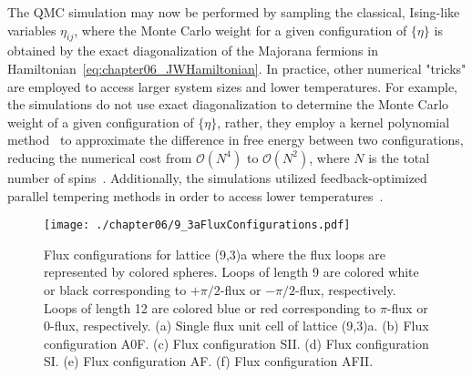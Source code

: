 The QMC simulation may now be performed by sampling the classical, Ising-like variables $\eta_{ij}$, where the Monte Carlo weight for a given configuration of $\{\eta\}$ is obtained by the exact diagonalization of the Majorana fermions in Hamiltonian~\eqref{eq:chapter06_JWHamiltonian}.
In practice, other numerical "tricks" are employed to access larger system sizes and lower temperatures.
For example, the simulations do not use exact diagonalization to determine the Monte Carlo weight of a given configuration of $\{\eta\}$, rather, they employ a kernel polynomial method~\cite{WeisseRMP2006,WeissePRL2009} to approximate the difference in free energy between two configurations, reducing the numerical cost from $\mathcal{O}(N^4)$ to $\mathcal{O}(N^2)$, where $N$ is the total number of spins~\cite{MischenkoPRB2017}.
Additionally, the simulations utilized feedback-optimized parallel tempering methods in order to access lower temperatures~\cite{TrebstPRE2004,KatzgraberJSM2006}.
\begin{figure}[tb]
	\centering
	\texttt{[image: ./chapter06/9\_3aFluxConfigurations.pdf]}
	\caption{
		Flux configurations for lattice (9,3)a where the flux loops are represented by colored spheres.
		Loops of length 9 are colored white or black corresponding to $+\pi/2$-flux or $-\pi/2$-flux, respectively.
		Loops of length 12 are colored blue or red corresponding to $\pi$-flux or $0$-flux, respectively.
		(a) Single flux unit cell of lattice (9,3)a.
		(b) Flux configuration A0F.
		(c) Flux configuration SII.
		(d) Flux configuration SI.
		(e) Flux configuration AF.
		(f) Flux configuration AFII.
	}
	\label{fig:chapter06_9_3aFluxConfigurations}
\end{figure}
%


%
%
